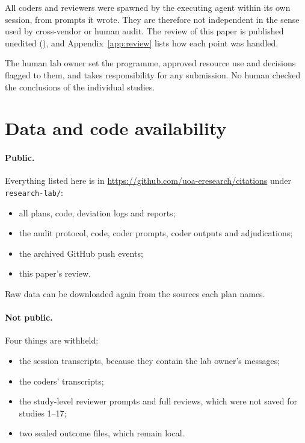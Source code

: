 \documentclass[11pt]{article}
\begin{document}
All coders and reviewers were spawned by the executing agent within its own session, from prompts it wrote. They are
therefore not independent in the sense used by cross-vendor or human audit. The review of this paper is published
unedited (), and Appendix~\ref{app:review} lists how each point was handled.

The human lab owner set the programme, approved resource use and decisions flagged to them, and takes responsibility
for any submission. No human checked the conclusions of the individual studies.

\section*{Data and code availability}

\paragraph{Public.} Everything listed here is in \url{https://github.com/uoa-eresearch/citations} under
\texttt{research-lab/}:
\begin{itemize}
\item all plans, code, deviation logs and reports;
\item the audit protocol, code, coder prompts, coder outputs and adjudications;
\item the archived GitHub push events;
\item this paper's review.
\end{itemize}
Raw data can be downloaded again from the sources each plan names.

\paragraph{Not public.} Four things are withheld:
\begin{itemize}
\item the session transcripts, because they contain the lab owner's messages;
\item the coders' transcripts;
\item the study-level reviewer prompts and full reviews, which were not saved for studies 1--17;
\item two sealed outcome files, which remain local.
\end{itemize}




\appendix

\end{document}
